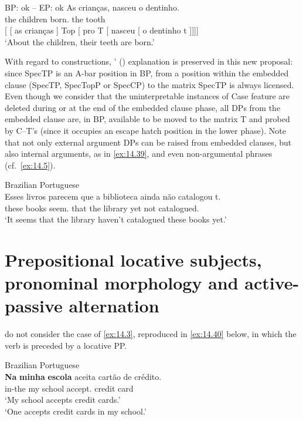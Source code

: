 \documentclass[output=paper]{langsci/langscibook}
\begin{document}
\ea%
    \label{ex:14.38} \gls{BP}: ok -- \gls{EP}: ok
    \ea
    \gll    As crianças, nasceu o dentinho.\\
            the children born.\Tsg{} the tooth\\
    \glt
    \ex     {}[ [ as crianças ] Top [ pro\tss{\Expl} T [ nasceu [ o dentinho t ]]]]\\
            ‘About the children, their teeth are born.’
    \z
\z

With regard to  constructions,
\citeauthor{AvelarGalves2011}' (\citeyear{AvelarGalves2011,AvelarGalves2016})
explanation is preserved in this new proposal: since SpecTP is an A-bar
position in BP,  from a position within the embedded clause (SpecTP,
SpecTopP or SpecCP) to the matrix SpecTP is always licensed. Even though we
consider that the uninterpretable instances of Case feature are deleted during
or at the end of the embedded clause phase, all DPs from the embedded clause
are, in BP, available to be moved to the matrix T and probed by C--T’s
 (since it occupies an escape hatch position in the lower
phase).  Note that not only external argument DPs can be raised from embedded
clauses, but also internal arguments, as in \eqref{ex:14.39}, and even
non-argumental phrases (cf.\ \ref{ex:14.5}).

\ea\label{ex:14.39}Brazilian Portuguese\\
    \gll    Esses  livros parecem que a biblioteca ainda não catalogou t.\\
            these books seem.\Tpl{} that   the library yet not catalogued.\Tsg{}\\
    \glt    ‘It seems that the library haven’t catalogued these books yet.’
\z

\section{Prepositional locative subjects, pronominal morphology and
active-passive alternation}\label{sec:14.6}\largerpage[2]

\textcite{AvelarGalves2011,AvelarGalves2016} do not consider the case of
\eqref{ex:14.3}, reproduced in \eqref{ex:14.40} below, in which the verb
is preceded by a locative PP.

\ea%
    \label{ex:14.40}Brazilian Portuguese\\
    \gll    \textbf{Na} \textbf{minha} \textbf{escola} aceita {cartão de crédito}.\\
            in-the my school accept.\Tsg{} {credit card}\\
    \glt    ‘My school accepts credit cards.’\\
            ‘One accepts credit cards in my school.’
\z
\end{document}
